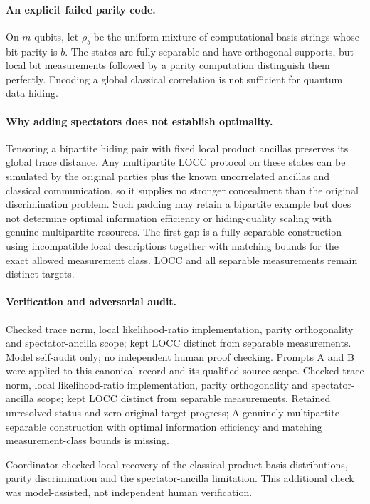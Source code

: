 \documentclass[11pt]{article}
\begin{document}
\paragraph{An explicit failed parity code.} On $m$ qubits, let $\rho_b$ be the uniform mixture of computational basis strings whose bit parity is $b$. The states are fully separable and have orthogonal supports, but local bit measurements followed by a parity computation distinguish them perfectly. Encoding a global classical correlation is not sufficient for quantum data hiding.

\paragraph{Why adding spectators does not establish optimality.} Tensoring a bipartite hiding pair with fixed local product ancillas preserves its global trace distance. Any multipartite LOCC protocol on these states can be simulated by the original parties plus the known uncorrelated ancillas and classical communication, so it supplies no stronger concealment than the original discrimination problem. Such padding may retain a bipartite example but does not determine optimal information efficiency or hiding-quality scaling with genuine multipartite resources. The first gap is a fully separable construction using incompatible local descriptions together with matching bounds for the exact allowed measurement class. LOCC and all separable measurements remain distinct targets.

\paragraph{Verification and adversarial audit.}
Checked trace norm, local likelihood-ratio implementation, parity orthogonality and spectator-ancilla scope; kept LOCC distinct from separable measurements. Model self-audit only; no independent human proof checking. Prompts A and B were applied to this canonical record and its qualified source scope. Checked trace norm, local likelihood-ratio implementation, parity orthogonality and spectator-ancilla scope; kept LOCC distinct from separable measurements. Retained unresolved status and zero original-target progress; A genuinely multipartite separable construction with optimal information efficiency and matching measurement-class bounds is missing.

Coordinator checked local recovery of the classical product-basis distributions, parity discrimination and the spectator-ancilla limitation. This additional check was model-assisted, not independent human verification.
\end{document}
